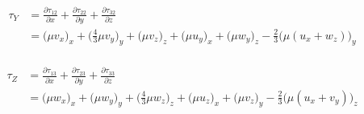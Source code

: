 \documentclass{article}
\numberwithin{equation}{subsection}
\begin{document}
\begin{align}
\begin{split}
    \tau_Y &= \frac{\partial \tau_{12}}{\partial x} + \frac{\partial \tau_{22}}{\partial y} + \frac{\partial \tau_{32}}{\partial z} \\
    &= \Big(\mu v_x \Big)_x + \Big(\frac{4}{3} \mu v_y \Big)_y + \Big(\mu v_z \Big)_z + \Big(\mu u_y\Big)_x + \Big(\mu w_y\Big)_z - \frac{2}{3}\Big(\mu (u_x + w_z)\Big)_y
\end{split}
\end{align}

\begin{align}
\begin{split}
    \tau_Z &= \frac{\partial \tau_{13}}{\partial x} + \frac{\partial \tau_{23}}{\partial y} + \frac{\partial \tau_{33}}{\partial z} \\
    &= \Big(\mu w_x\Big)_x + \Big(\mu w_y\Big)_y + \Big(\frac{4}{3} \mu w_z\Big)_z + \Big(\mu u_z\Big)_x + \Big(\mu v_z\Big)_y - \frac{2}{3}\Big(\mu (u_x + v_y)\Big)_z
\end{split}
\end{align}



\end{document}
